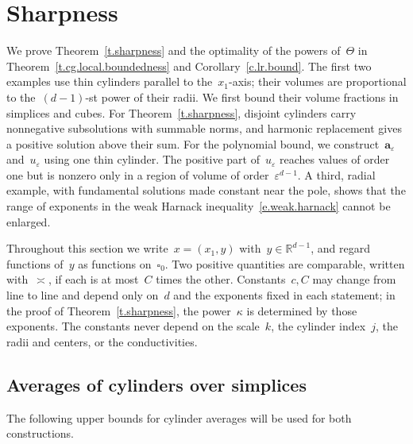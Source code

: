 \documentclass[11pt,letterpaper]{article}
\numberwithin{equation}{section}
\theoremstyle{definition}
\newcommand{\R}{\mathbb{R}}
\renewcommand{\a}{\mathbf{a}}
\newcommand{\eps}{\varepsilon}
\newcommand{\cu}{\square}
\begin{document}
\section{Sharpness}
\label{s.sharpness}

We prove Theorem~\ref{t.sharpness} and the optimality of the powers of~$\Theta$ in Theorem~\ref{t.cg.local.boundedness} and Corollary~\ref{c.lr.bound}. The first two examples use thin cylinders parallel to the~$x_1$-axis; their volumes are proportional to the~$(d-1)$-st power of their radii. We first bound their volume fractions in simplices and cubes. For Theorem~\ref{t.sharpness}, disjoint cylinders carry nonnegative subsolutions with summable norms, and harmonic replacement gives a positive solution above their sum. For the polynomial bound, we construct~$\a_\eps$ and~$u_\eps$ using one thin cylinder. The positive part of~$u_\eps$ reaches values of order one but is nonzero only in a region of volume of order~$\eps^{d-1}$. A third, radial example, with fundamental solutions made constant near the pole, shows that the range of exponents in the weak Harnack inequality~\eqref{e.weak.harnack} cannot be enlarged.

\smallskip
Throughout this section we write~$x=(x_1,y)$ with~$y\in\R^{d-1}$, and regard functions of~$y$ as functions on~$\cu_0$. Two positive quantities are comparable, written with~$\asymp$, if each is at most~$C$ times the other. Constants~$c,C$ may change from line to line and depend only on~$d$ and the exponents fixed in each statement; in the proof of Theorem~\ref{t.sharpness}, the power~$\kappa$ is determined by those exponents. The constants never depend on the scale~$k$, the cylinder index~$j$, the radii and centers, or the conductivities.

\subsection{Averages of cylinders over simplices}
\label{ss.sharpness.cylinders}

The following upper bounds for cylinder averages will be used for both constructions.
\end{document}
